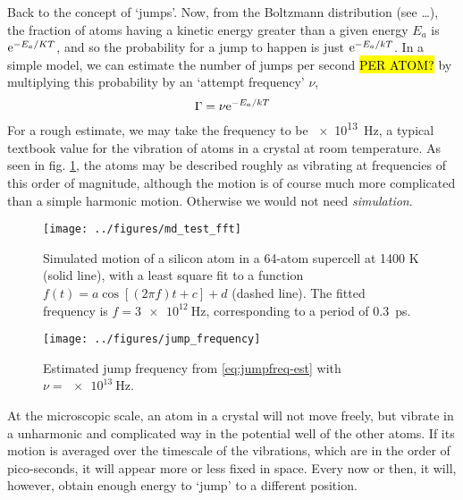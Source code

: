 \documentclass[11pt,bibliography=totoc,index=totoc]{scrbook}   %
\newcommand{\comment}[1]{\hl{#1}}
\begin{document}
Back to the concept of `jumps'. Now, from the Boltzmann distribution (see \ldots), the fraction of atoms having a kinetic energy greater than a given energy $E_a$ is $\mathrm{e}^{-E_a/KT}$, and so the probability for a jump to happen is just $\mathrm{e}^{-E_a/kT}$. 
In a simple model, we can estimate the number of jumps per second \comment{PER ATOM?} by multiplying this probability by an `attempt frequency' $\nu$,
\begin{equation}
  \Gamma = \nu \mathrm{e}^{-E_a/kT}
  \label{eq:jumpfreq-est}
\end{equation}
For a rough estimate, we may take the frequency to be \SI{e13}{\hertz}, a typical textbook value for the vibration of atoms in a crystal at room temperature.\cite[212]{Tilley:2004}
As seen in fig. \ref{fig:simple-vibration}, the atoms may be described roughly as vibrating at frequencies of this order of magnitude, although the motion is of course much more complicated than a simple harmonic motion. Otherwise we would not need \emph{simulation}.

\begin{figure}[htbp]
  \begin{center}
    \texttt{[image: ../figures/md\_test\_fft]}
  \end{center}
  \caption{
    Simulated motion of a silicon atom in a 64-atom supercell at 1400 K (solid line), 
    with a least square fit to a function $f(t) = a \cos[(2\pi f)t + c] + d$ (dashed line). 
    The fitted frequency is $f=\SI{3e12}{\hertz}$, corresponding to a period of 0.3~ps.
  }
  \label{fig:simple-vibration}
\end{figure}

\begin{figure}[htbp]
  \begin{center}
    \texttt{[image: ../figures/jump\_frequency]}
  \end{center}
  \caption{Estimated jump frequency from \eqref{eq:jumpfreq-est} with $\nu=\SI{e13}{\hertz}$.}
  \label{fig:jumpfreq-est}
\end{figure}




At the microscopic scale, an atom in a crystal will not move freely, but vibrate in a unharmonic and complicated way in the potential well of the other atoms. 
If its motion is averaged over the timescale of the vibrations, which are in the order of pico-seconds, it will appear more or less fixed in space. 
Every now or then, it will, however, obtain enough energy to `jump' to a different position.
\end{document}
